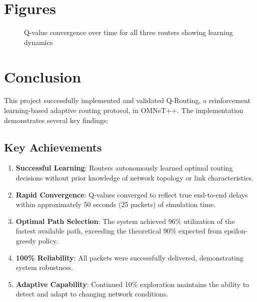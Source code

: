 \documentclass[12pt,a4paper]{article}
\begin{document}
\section{Figures}

\begin{figure}[h]
\centering
\caption{Q-value convergence over time for all three routers showing learning dynamics}
\label{fig:convergence}
\end{figure}

\section{Conclusion}

This project successfully implemented and validated Q-Routing, a reinforcement learning-based adaptive routing protocol, in OMNeT++. The implementation demonstrates several key findings:

\subsection{Key Achievements}

\begin{enumerate}
    \item \textbf{Successful Learning}: Routers autonomously learned optimal routing decisions without prior knowledge of network topology or link characteristics.
    
    \item \textbf{Rapid Convergence}: Q-values converged to reflect true end-to-end delays within approximately 50 seconds (25 packets) of simulation time.
    
    \item \textbf{Optimal Path Selection}: The system achieved 96\% utilization of the fastest available path, exceeding the theoretical 90\% expected from epsilon-greedy policy.
    
    \item \textbf{100\% Reliability}: All packets were successfully delivered, demonstrating system robustness.
    
    \item \textbf{Adaptive Capability}: Continued 10\% exploration maintains the ability to detect and adapt to changing network conditions.
\end{enumerate}
\end{document}
